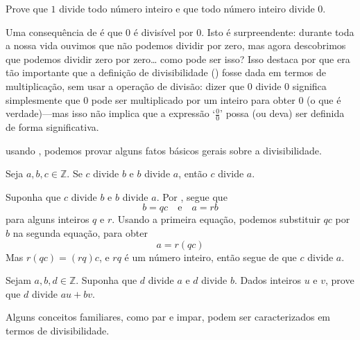 \begin{exercise}
\label{exOneDividesEveryIntegerDividesZero}
Prove que $1$ divide todo número inteiro e que todo número inteiro divide $0$.
\end{exercise}

Uma consequência de  é que $0$ é divisível por $0$. Isto é surpreendente: durante toda a nossa vida ouvimos que não podemos dividir por zero, mas agora descobrimos que podemos dividir zero por zero\dots{} como pode ser isso? Isso destaca por que era tão importante que a definição de divisibilidade () fosse dada em termos de multiplicação, sem usar a operação de divisão: dizer que $0$ divide $0$ significa simplesmente que $0$ pode ser multiplicado por um inteiro para obter $0$ (o que é verdade)---mas isso não implica que a expressão `$\frac{0}{0}$' possa (ou deva) ser definida de forma significativa.

usando , podemos provar alguns fatos básicos gerais sobre a divisibilidade.


\begin{proposition}
\label{propDivisibilityIsTransitive}
Seja $a,b,c \in \mathbb{Z}$. Se $c$ divide $b$ e $b$ divide $a$, então $c$ divide $a$.
\end{proposition}

\begin{cproof}


Suponha que $c$ divide $b$ e $b$ divide $a$. Por , segue que
\[ b=qc \quad \text{e} \quad a=rb \]
para alguns inteiros $q$ e $r$. Usando a primeira equação, podemos substituir $qc$ por $b$ na segunda equação, para obter
\[ a=r(qc) \]
Mas $r(qc) = (rq)c$, e $rq$ é um número inteiro, então segue de  que $c$ divide $a$.
\end{cproof}


\begin{exercise}
\label{exDivisibilityIsLinear}
Sejam $a,b,d \in \mathbb{Z}$. Suponha que $d$ divide $a$ e $d$ divide $b$. Dados inteiros $u$ e $v$, prove que $d$ divide $au+bv$.
\end{exercise}

Alguns conceitos familiares, como par e impar, podem ser caracterizados em termos de divisibilidade.

